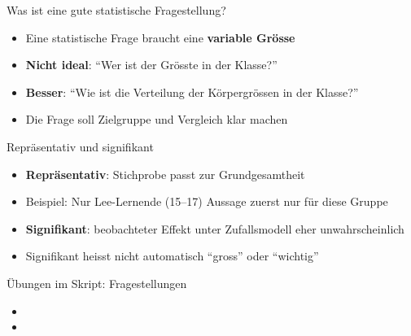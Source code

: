 \begin{frame}{Was ist eine gute statistische Fragestellung?}
    \begin{itemize}[<+->]
        \item Eine statistische Frage braucht eine \textbf{variable Grösse}
        \item \textbf{Nicht ideal}: \enquote{Wer ist der Grösste in der Klasse?}
        \item \textbf{Besser}: \enquote{Wie ist die Verteilung der Körpergrössen in der Klasse?}
        \item Die Frage soll Zielgruppe und Vergleich klar machen
    \end{itemize}
\end{frame}

\begin{frame}{Repräsentativ und signifikant}
    \begin{itemize}[<+->]
        \item \textbf{Repräsentativ}: Stichprobe passt zur Grundgesamtheit
        \item Beispiel: Nur Lee-Lernende (15--17) \Rightarrow Aussage zuerst nur für diese Gruppe
        \item \textbf{Signifikant}: beobachteter Effekt unter Zufallsmodell eher unwahrscheinlich
        \item Signifikant heisst nicht automatisch \enquote{gross} oder \enquote{wichtig}
    \end{itemize}
\end{frame}

\begin{frame}{Übungen im Skript: Fragestellungen}
    \begin{itemize}
        \item {}
        \item {}
    \end{itemize}
\end{frame}

